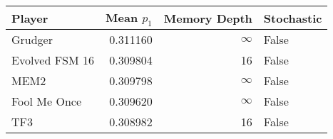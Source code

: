 \begin{tabular}{lrrl}
\toprule
         Player &  Mean $p_1$ &  Memory Depth & Stochastic \\
\midrule
        Grudger &    0.311160 &            \(\infty\) &      False \\
 Evolved FSM 16 &    0.309804 &            16 &      False \\
           MEM2 &    0.309798 &            \(\infty\) &      False \\
   Fool Me Once &    0.309620 &            \(\infty\) &      False \\
            TF3 &    0.308982 &            16 &      False \\
\bottomrule
\end{tabular}
